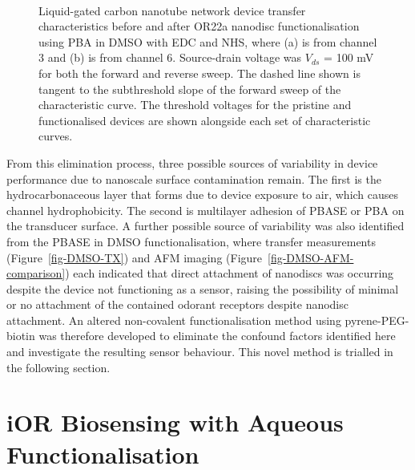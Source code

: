 \documentclass[
  a4paper,
]{scrbook}
\begin{document}
\begin{figure}
\begin{minipage}[t]{0.45\linewidth}
{{}

}

\end{minipage}%
%
\begin{minipage}[t]{0.01\linewidth}

{\centering 

~

}

\end{minipage}%

\caption[Liquid-gated carbon nanotube network device transfer
characteristics before and after OR22a nanodisc functionalisation using
PBA in DMSO with EDC and NHS, with threshold voltage shown alongside
each transfer curve.]{\label{fig-EDCNHS-TX}Liquid-gated carbon nanotube
network device transfer characteristics before and after OR22a nanodisc
functionalisation using PBA in DMSO with EDC and NHS, where (a) is from
channel 3 and (b) is from channel 6. Source-drain voltage was \(V_{ds}\)
= 100 mV for both the forward and reverse sweep. The dashed line shown
is tangent to the subthreshold slope of the forward sweep of the
characteristic curve. The threshold voltages for the pristine and
functionalised devices are shown alongside each set of characteristic
curves.}

\end{figure}

From this elimination process, three possible sources of variability in
device performance due to nanoscale surface contamination remain. The
first is the hydrocarbonaceous layer that forms due to device exposure
to air, which causes channel hydrophobicity. The second is multilayer
adhesion of PBASE or PBA on the transducer surface. A further possible
source of variability was also identified from the PBASE in DMSO
functionalisation, where transfer measurements
(Figure~\ref{fig-DMSO-TX}) and AFM imaging
(Figure~\ref{fig-DMSO-AFM-comparison}) each indicated that direct
attachment of nanodiscs was occurring despite the device not functioning
as a sensor, raising the possibility of minimal or no attachment of the
contained odorant receptors despite nanodisc attachment. An altered
non-covalent functionalisation method using pyrene-PEG-biotin was
therefore developed to eliminate the confound factors identified here
and investigate the resulting sensor behaviour. This novel method is
trialled in the following section.

\hypertarget{sec-aqueous-functionalisation-biosensing}{%
\section{iOR Biosensing with Aqueous
Functionalisation}\label{sec-aqueous-functionalisation-biosensing}}
\end{document}
